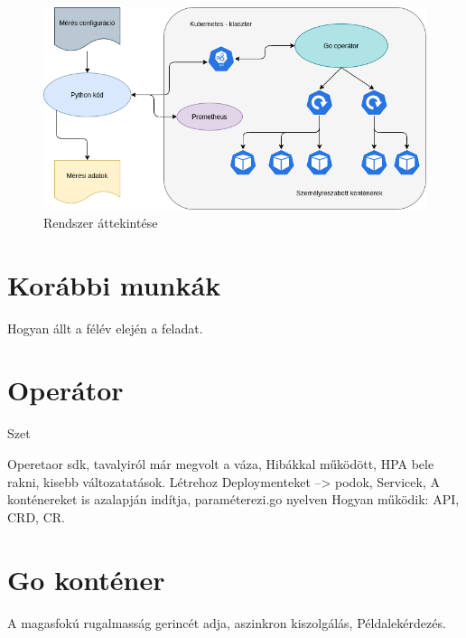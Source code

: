 \begin{figure}[!ht]
\centering
\includegraphics[width=150mm, keepaspectratio]{figures/system_overview.png}
\caption{Rendszer áttekintése}
\label{fig:system_overview}
\end{figure}

\section{Korábbi munkák}
Hogyan állt a félév elején a feladat.

\section{Operátor}
Szet

Operetaor sdk, tavalyiról már megvolt a váza, Hibákkal működött, HPA bele rakni, kisebb változatatások. Létrehoz Deploymenteket --> podok, Servicek, 
A konténereket is azalapján indítja, paraméterezi.go nyelven
Hogyan működik: API, CRD, CR.

\section{Go konténer}


A magasfokú rugalmasság gerincét adja, aszinkron kiszolgálás, Példalekérdezés.

